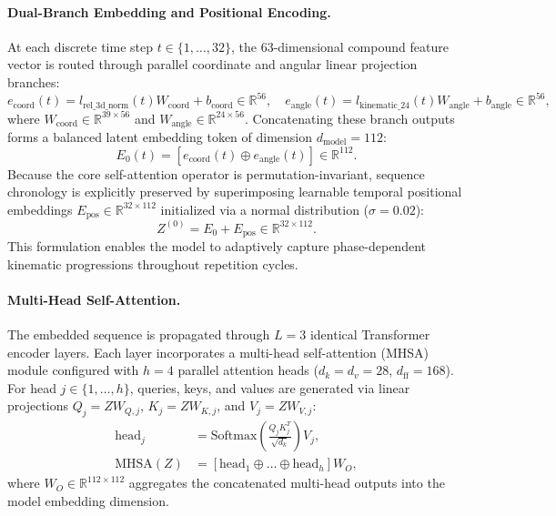\documentclass[runningheads]{llncs}
\begin{document}
\paragraph{Dual-Branch Embedding and Positional Encoding.} At each discrete time step $t \in \{1, \dots, 32\}$, the 63-dimensional compound feature vector is routed through parallel coordinate and angular linear projection branches:
\begin{equation}
    e_{\text{coord}}(t) = l_{\text{rel\_3d\_norm}}(t) W_{\text{coord}} + b_{\text{coord}} \in \mathbb{R}^{56}, \quad e_{\text{angle}}(t) = l_{\text{kinematic\_24}}(t) W_{\text{angle}} + b_{\text{angle}} \in \mathbb{R}^{56},
\end{equation}
where $W_{\text{coord}} \in \mathbb{R}^{39 \times 56}$ and $W_{\text{angle}} \in \mathbb{R}^{24 \times 56}$. Concatenating these branch outputs forms a balanced latent embedding token of dimension $d_{\text{model}} = 112$:
\begin{equation}
    E_0(t) = \left[ e_{\text{coord}}(t) \oplus e_{\text{angle}}(t) \right] \in \mathbb{R}^{112}.
\end{equation}
Because the core self-attention operator is permutation-invariant, sequence chronology is explicitly preserved by superimposing learnable temporal positional embeddings $E_{\text{pos}} \in \mathbb{R}^{32 \times 112}$ initialized via a normal distribution ($\sigma = 0.02$):
\begin{equation}
    Z^{(0)} = E_0 + E_{\text{pos}} \in \mathbb{R}^{32 \times 112}.
\end{equation}
This formulation enables the model to adaptively capture phase-dependent kinematic progressions throughout repetition cycles.

\paragraph{Multi-Head Self-Attention.} The embedded sequence is propagated through $L = 3$ identical Transformer encoder layers. Each layer incorporates a multi-head self-attention (MHSA) module configured with $h = 4$ parallel attention heads ($d_k = d_v = 28$, $d_{\text{ff}} = 168$). For head $j \in \{1, \dots, h\}$, queries, keys, and values are generated via linear projections $Q_j = Z W_{Q, j}$, $K_j = Z W_{K, j}$, and $V_j = Z W_{V, j}$:
\begin{align}
    \mathrm{head}_j &= \mathrm{Softmax}\left( \frac{Q_j K_j^T}{\sqrt{d_k}} \right) V_j, \\
    \mathrm{MHSA}(Z) &= \left[ \mathrm{head}_1 \oplus \dots \oplus \mathrm{head}_h \right] W_O,
\end{align}
where $W_O \in \mathbb{R}^{112 \times 112}$ aggregates the concatenated multi-head outputs into the model embedding dimension.
\end{document}
